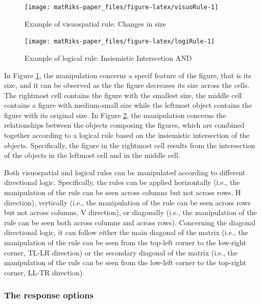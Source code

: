 \begin{figure}

{\centering \texttt{[image: matRiks-paper\_files/figure-latex/visuoRule-1]} 

}

\caption{Example of visuospatial rule: Changes in size}\label{fig:visuoRule}
\end{figure}

\begin{figure}

{\centering \texttt{[image: matRiks-paper\_files/figure-latex/logiRule-1]} 

}

\caption{Example of logical rule: Insiemistic Interscetion AND}\label{fig:logiRule}
\end{figure}

In Figure \ref{fig:visuoRule}, the manipulation concerns a specif feature of the figure, that is its size, and it can be observed as the the figure decreases its size across the cells.
The rightmost cell contains the figure with the smallest size, the middle cell contains a figure with medium-small size while the leftmost object contains the figure with its original size.
In Figure \ref{fig:logiRule}, the manipulation concerns the relationships between the objects composing the figures, which are combined together according to a logical rule based on the insiemistic intersection of the objects. Specifically, the figure in the rightmost cell results from the intersection of the objects in the leftmost cell and in the middle cell.

Both visuospatial and logical rules can be manipulated according to different directional logic.
Specifically, the rules can be applied horizontally (i.e., the manipulation of the rule can be seen across columns but not across rows, H direction), vertically (i.e., the manipulation of the rule can be seen across rows but not across columns, V direction), or diagonally (i.e., the manipulation of the rule can be seen both across columns and across rows). Concerning the diagonal directional logic, it can follow either the main diagonal of the matrix (i.e., the manipulation of the rule can be seen from the top-left corner to the low-right corner, TL-LR direction) or the secondary diagonal of the matrix (i.e., the manipulation of the rule can be seen from the low-left corner to the top-right corner, LL-TR direction).

\hypertarget{the-response-options}{%
\subsubsection{The response options}\label{the-response-options}}

